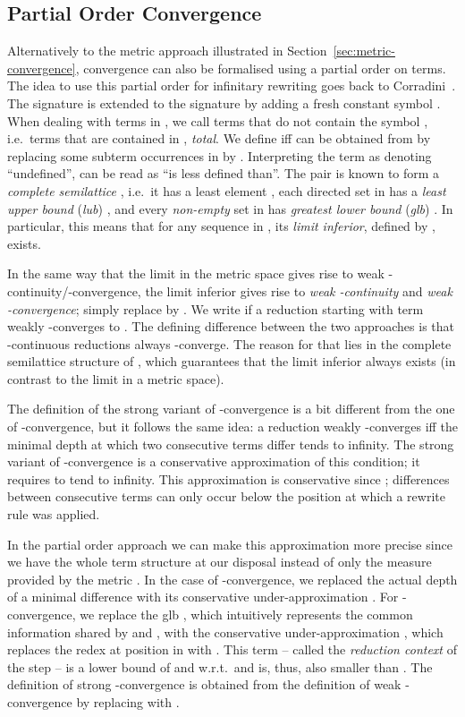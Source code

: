 \documentclass[copyright,creativecommons,UKenglish,final]{eptcs}
\theoremstyle{definition}
\theoremstyle{plain}
\begin{document}
\subsection{Partial Order Convergence}
\label{sec:part-order-conv}

Alternatively to the metric approach illustrated in
Section~\ref{sec:metric-convergence}, convergence can also be
formalised using a partial order  on terms. The idea to use
this partial order for infinitary rewriting goes back to
Corradini~\cite{corradini93tapsoft}. The signature  is
extended to the signature  by adding a fresh constant
symbol . When dealing with terms in , we call terms
that do not contain the symbol , i.e.\ terms that are contained
in , \emph{total}. We define  iff  can be
obtained from  by replacing some subterm occurrences in  by
. Interpreting the term  as denoting ``undefined'',
 can be read as ``is less defined than''. The pair
 is known to form a \emph{complete semilattice}
\cite{goguen77jacm}, i.e.\ it has a least element , each
directed set  in  has a \emph{least upper bound}
(\emph{lub}) , and every \emph{non-empty} set  in
 has \emph{greatest lower bound} (\emph{glb}) . In particular, this means that for any sequence
 in , its \emph{limit
  inferior}, defined by , exists.

In the same way that the limit in the metric space gives rise to weak
-continuity/-convergence, the limit inferior gives rise to
\emph{weak -continuity} and \emph{weak -convergence};
simply replace  by . We write 
if a reduction  starting with term  weakly -converges to
. The defining difference between the two approaches is that
-continuous reductions always -converge. The reason for
that lies in the complete semilattice structure of
, which guarantees that the limit inferior always
exists (in contrast to the limit in a metric space).

The definition of the strong variant of -convergence is a bit
different from the one of -convergence, but it follows the same
idea: a reduction 
weakly -converges iff the minimal depth  at which two
consecutive terms  differ tends to infinity. The strong
variant of -convergence is a conservative approximation of this
condition; it requires  to tend to infinity. This
approximation is conservative since ; differences
between consecutive terms can only occur below the position at which a
rewrite rule was applied.

In the partial order approach we can make this approximation more
precise since we have the whole term structure at our disposal instead
of only the measure provided by the metric . In the case of
-convergence, we replaced the actual depth of a minimal
difference  with its conservative under-approximation
. For -convergence, we replace the glb , which intuitively represents the common information shared
by  and , with the conservative under-approximation
, which replaces the redex at position
 in  with . This term
 -- called the \emph{reduction context}
of the step  -- is a lower bound of
 and  w.r.t.\  and is, thus, also smaller than
. The definition of strong -convergence is
obtained from the definition of weak -convergence by replacing
 with
.
\end{document}
